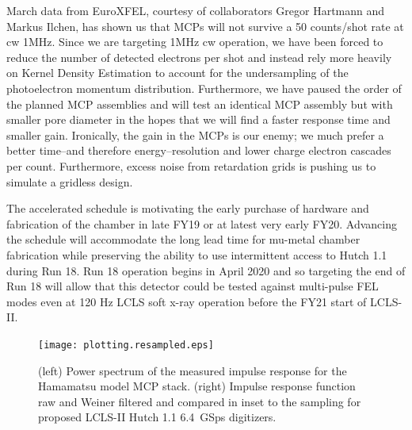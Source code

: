 \documentclass[aps]{revtex4}
\begin{document}
March data from EuroXFEL, courtesy of collaborators Gregor Hartmann and Markus Ilchen, has shown us that MCPs will not survive a 50 counts/shot rate at cw 1MHz.
Since we are targeting 1MHz cw operation, we have been forced to reduce the number of detected electrons per shot and instead rely more heavily on Kernel Density Estimation to account for the undersampling of the photoelectron momentum distribution.
Furthermore, we have paused the order of the planned MCP assemblies and will test an identical MCP assembly but with smaller pore diameter in the hopes that we will find a faster response time and smaller gain.
Ironically, the gain in the MCPs is our enemy; we much prefer a better time--and therefore energy--resolution and lower charge electron cascades per count.
Furthermore, excess noise from retardation grids is pushing us to simulate a gridless design.

The accelerated schedule is motivating the early purchase of hardware and fabrication of the chamber in late FY19 or at latest very early FY20.
Advancing the schedule will accommodate the long lead time for mu-metal chamber fabrication while preserving the ability to use intermittent access to Hutch 1.1 during Run 18.
Run 18 operation begins in April 2020 and so targeting the end of Run 18 will allow that this detector could be tested against multi-pulse FEL modes even at 120 Hz LCLS soft x-ray operation before the FY21 start of LCLS-II.

\begin{figure}
\centerline{\texttt{[image: plotting.resampled.eps]}}
\caption{\label{fig::powerspec}
(left) Power spectrum of the measured impulse response for the Hamamatsu model MCP stack.
(right) Impulse response function raw and Weiner filtered and compared in inset to the sampling for proposed LCLS-II Hutch 1.1 6.4~GSps digitizers.
}
\end{figure}
\end{document}
